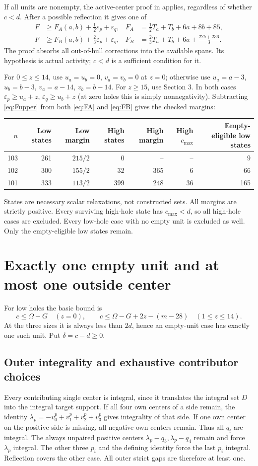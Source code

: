 \documentclass[11pt,a4paper]{article}
\begin{document}
If all units are nonempty, the active-center proof in \cite{previous}
applies, regardless of whether $c<d$. After a possible reflection it gives
one of
\begin{align}
 F&\ge F_A(a,b)+\tfrac12\varepsilon_p+\varepsilon_q,
 &F_A&=\tfrac12T_a+T_b+6a+8b+85,\label{eq:FA}\\
 F&\ge F_B(a,b)+\tfrac23\varepsilon_p+\varepsilon_q,
 &F_B&=\tfrac23T_a+T_b+6a+\tfrac{22b+236}{3}.\label{eq:FB}
\end{align}
The proof absorbs all out-of-hull corrections into the available spans.
Its hypothesis is actual activity; $c<d$ is a sufficient condition for it.

For $0\le z\le14$, use $u_a=u_b=0$, $v_a=v_b=0$ at $z=0$;
otherwise use $u_a=a-3$, $u_b=b-3$, $v_a=a-14$, $v_b=b-14$.
For $z\ge15$, use Section 3. In both cases
$\varepsilon_p\ge u_a+z$, $\varepsilon_q\ge u_b+z$ (at zero holes
this is simply nonnegativity). Subtracting \eqref{eq:Fupper} from both
\eqref{eq:FA} and \eqref{eq:FB} gives the checked margins:
\begin{center}\small
\begin{tabular}{rrrrrrr}
\toprule
$n$&Low states&Low margin&High states&High margin&High $c_{\max}$&Empty-eligible low states\\
\midrule
103&261&$215/2$&0&--&--&9\\
102&300&$155/2$&32&365&6&66\\
101&333&$113/2$&399&248&36&165\\
\bottomrule
\end{tabular}
\end{center}
States are necessary scalar relaxations, not constructed sets. All margins
are strictly positive. Every surviving high-hole state has $c_{\max}<d$,
so all high-hole cases are excluded. Every low-hole case with no empty
unit is excluded as well. Only the empty-eligible low states remain.

\section{Exactly one empty unit and at most one outside center}
For low holes the basic bound is
\[
 c\le\Omega-G\quad(z=0),\qquad
 c\le\Omega-G+2z-(m-28)\quad(1\le z\le14).
\]
At the three sizes it is always less than $2d$, hence an empty-unit case
has exactly one such unit. Put $\delta=c-d\ge0$.

\subsection{Outer integrality and exhaustive contributor choices}
Every contributing single center is integral, since it translates the
integral set $D$ into the integral target support. If all four own centers
of a side remain, the identity
$\lambda_p=-v^p_0+v^p_1+v^p_2+v^p_3$ gives integrality of that side.
If one own center on the positive side is missing, all negative own
centers remain. Thus all $q_i$ are integral. The always unpaired positive
centers $\lambda_p-q_3,\lambda_p-q_4$ remain and force $\lambda_p$ integral.
The other three $p_i$ and the defining identity force the last $p_i$
integral. Reflection covers the other case. All outer strict gaps are
therefore at least one.
\end{document}
